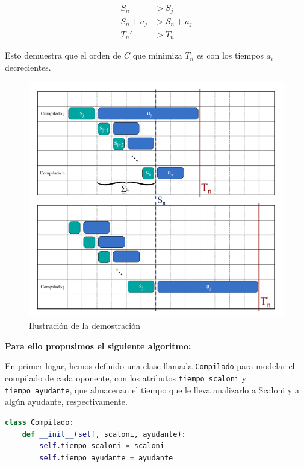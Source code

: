 $$
\begin{aligned}
S_{n} & > S_{j} \\
S_{n} + a_{j}  & > S_{n} + a_{j}  \\
T_{n}' & > T_{n}
\end{aligned}
$$

Esto demuestra que el orden de $C$ que minimiza $T_n$ es con los tiempos $a_i$ decrecientes.


\begin{figure}[H]
    \centering
    \includegraphics[width=1\textwidth]{img/demostracion.png}
    \caption{Ilustración de la demostración}
    \label{fig:Ilustración de la demostración}
\end{figure}


\textbf{Para ello propusimos el siguiente algoritmo:}

En primer lugar, hemos definido una clase llamada \texttt{Compilado} para modelar el compilado de cada 
oponente, con los atributos \texttt{tiempo\_scaloni} y \texttt{tiempo\_ayudante}, que almacenan 
el tiempo que le lleva analizarlo a Scaloni y a algún ayudante, respectivamente.

\begin{lstlisting}[language=Python]
class Compilado:
    def __init__(self, scaloni, ayudante):
        self.tiempo_scaloni = scaloni
        self.tiempo_ayudante = ayudante
\end{lstlisting}

